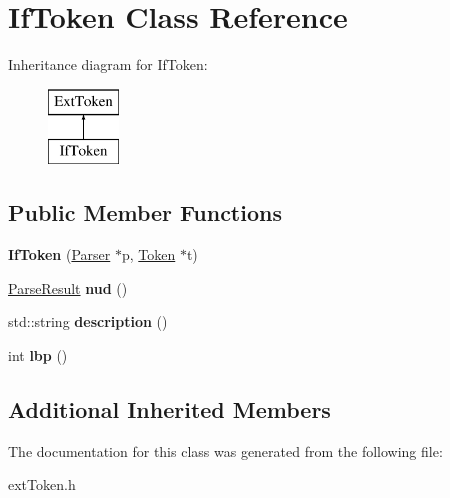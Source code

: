 \hypertarget{class_if_token}{}\section{If\+Token Class Reference}
\label{class_if_token}
Inheritance diagram for If\+Token\+:\begin{figure}[H]
\begin{center}
\leavevmode
\includegraphics[height=2.000000cm]{class_if_token}
\end{center}
\end{figure}
\subsection*{Public Member Functions}
\begin{DoxyCompactItemize}
\item 
\hypertarget{class_if_token_a607028595b06b8a950000ba3e82329db}{}{\bfseries If\+Token} (\hyperlink{class_parser}{Parser} $\ast$p, \hyperlink{class_token}{Token} $\ast$t)\label{class_if_token_a607028595b06b8a950000ba3e82329db}

\item 
\hypertarget{class_if_token_add06bd79ce755fd5503f78e507109e52}{}\hyperlink{class_parse_result}{Parse\+Result} {\bfseries nud} ()\label{class_if_token_add06bd79ce755fd5503f78e507109e52}

\item 
\hypertarget{class_if_token_aad226162c5649920c13c2a9e9e7a3617}{}std\+::string {\bfseries description} ()\label{class_if_token_aad226162c5649920c13c2a9e9e7a3617}

\item 
\hypertarget{class_if_token_abfd39ff4c4818d382bf0b97fd097c478}{}int {\bfseries lbp} ()\label{class_if_token_abfd39ff4c4818d382bf0b97fd097c478}

\end{DoxyCompactItemize}
\subsection*{Additional Inherited Members}


The documentation for this class was generated from the following file\+:\begin{DoxyCompactItemize}
\item 
ext\+Token.\+h\end{DoxyCompactItemize}
